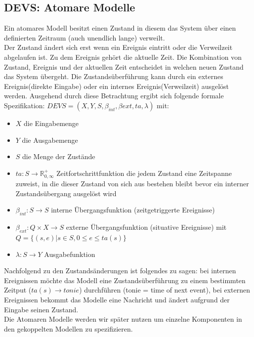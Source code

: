 \documentclass[11pt, fleqn, a4paper, leqno]{scrartcl} %
\begin{document}
	\subsection{DEVS: Atomare Modelle}
		Ein atomares Modell besitzt einen Zustand in diesem das System über einen definierten Zeitraum (auch unendlich lange) verweilt.\\
		Der Zustand ändert sich erst wenn ein Ereignis eintritt oder die Verweilzeit abgelaufen ist. Zu dem Ereignis gehört die aktuelle Zeit. Die Kombination von Zustand, Ereignis und der aktuellen Zeit entscheidet in welchen neuen Zustand das System übergeht. Die Zustandsüberführung kann durch ein externes Ereignis(direkte Eingabe) oder ein internes Ereignis(Verweilzeit) ausgelöst werden. Ausgehend durch diese Betrachtung ergibt sich folgende formale Spezifikation: $DEVS = (X,Y,S,\beta_{int},\beta{ext},ta,\lambda)$ mit: 
		\begin{itemize}
			\item $X$ die Eingabemenge
			\item $Y$ die Ausgabemenge
			\item $S$ die Menge der Zustände
			\item $ta: S \rightarrow \mathds{R}^{+}_{0,\infty}$ Zeitfortschrittfunktion die jedem Zustand eine Zeitspanne zuweist, in die dieser Zustand von sich aus bestehen bleibt bevor ein interner Zustandsübergang ausgelöst wird
			\item $\beta_{int}: S \rightarrow S$ interne Übergangsfunktion (zeitgetriggerte Ereignisse)
			\item $\beta_{ext}: Q \times X \rightarrow S$ externe Übergangsfunktion (situative Ereignisse) mit $Q=\{(s,e)|s\in S, 0 \leq e \leq ta(s)\}$
			\item $\lambda: S \rightarrow Y$ Ausgabefunktion
		\end{itemize}
		Nachfolgend zu den Zustandsänderungen ist folgendes zu sagen: bei internen Ereignissen möchte das Modell eine Zustandsüberführung zu einem bestimmten Zeitput ($ta(s) \rightarrow tonie$) durchführen (tonie = time of next event), bei externen Ereignissen bekommt das Modelle eine Nachricht und ändert aufgrund der Eingabe seinen Zustand.\\
		Die Atomaren Modelle werden wir später nutzen um einzelne Komponenten in den gekoppelten Modellen zu spezifizieren.
\end{document}
